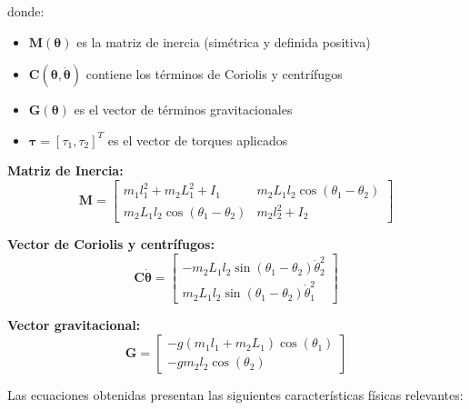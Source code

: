 donde:
\begin{itemize}
    \item $\mathbf{M}(\boldsymbol{\theta})$ es la matriz de inercia (simétrica y definida positiva)
    \item $\mathbf{C}(\boldsymbol{\theta}, \dot{\boldsymbol{\theta}})$ contiene los términos de Coriolis y centrífugos
    \item $\mathbf{G}(\boldsymbol{\theta})$ es el vector de términos gravitacionales
    \item $\boldsymbol{\tau} = [\tau_1, \tau_2]^T$ es el vector de torques aplicados
\end{itemize}

\textbf{Matriz de Inercia:}
\begin{equation}
\mathbf{M} = \begin{bmatrix}
m_1l_1^2 + m_2L_1^2 + I_1 & m_2L_1l_2\cos(\theta_1 - \theta_2) \\
m_2L_1l_2\cos(\theta_1 - \theta_2) & m_2l_2^2 + I_2
\end{bmatrix}
\end{equation}

\textbf{Vector de Coriolis y centrífugos:}
\begin{equation}
\mathbf{C}\dot{\boldsymbol{\theta}} = \begin{bmatrix}
-m_2L_1l_2\sin(\theta_1 - \theta_2)\dot{\theta}_2^2 \\
m_2L_1l_2\sin(\theta_1 - \theta_2)\dot{\theta}_1^2
\end{bmatrix}
\end{equation}

\textbf{Vector gravitacional:}
\begin{equation}
\mathbf{G} = \begin{bmatrix}
-g(m_1l_1 + m_2L_1)\cos(\theta_1) \\
-gm_2l_2\cos(\theta_2)
\end{bmatrix}
\end{equation}

Las ecuaciones obtenidas presentan las siguientes características físicas relevantes:

